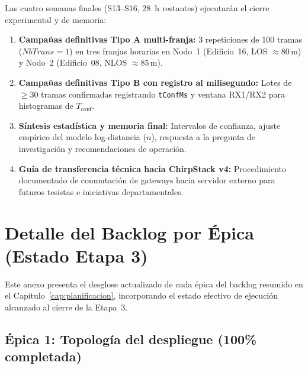 \documentclass[12pt,oneside,openany,spanish,oldfontcommands]{memoir}
\begin{document}
Las cuatro semanas finales (S13--S16, 28~h restantes) ejecutarán el cierre experimental y de memoria:
\begin{enumerate}
    \item \textbf{Campañas definitivas Tipo A multi-franja:} 3 repeticiones de 100 tramas ($NbTrans=1$) en tres franjas horarias en Nodo~1 (Edificio~16, LOS $\approx 80\,\text{m}$) y Nodo~2 (Edificio~08, NLOS $\approx 85\,\text{m}$).
    \item \textbf{Campañas definitivas Tipo B con registro al milisegundo:} Lotes de $\geq 30$ tramas confirmadas registrando \texttt{tConfMs} y ventana RX1/RX2 para histogramas de $T_{\mathrm{conf}}$.
    \item \textbf{Síntesis estadística y memoria final:} Intervalos de confianza, ajuste empírico del modelo log-distancia ($n$), respuesta a la pregunta de investigación y recomendaciones de operación.
    \item \textbf{Guía de transferencia técnica hacia ChirpStack v4:} Procedimiento documentado de conmutación de gateways hacia servidor externo para futuros tesistas e iniciativas departamentales.
\end{enumerate}

\appendix

\chapter{Detalle del Backlog por Épica (Estado Etapa 3)}

Este anexo presenta el desglose actualizado de cada épica del backlog resumido en el Capítulo~\ref{cap:planificacion},
incorporando el estado efectivo de ejecución alcanzado al cierre de la Etapa~3.

\section{Épica 1: Topología del despliegue (100\% completada)}
\end{document}
